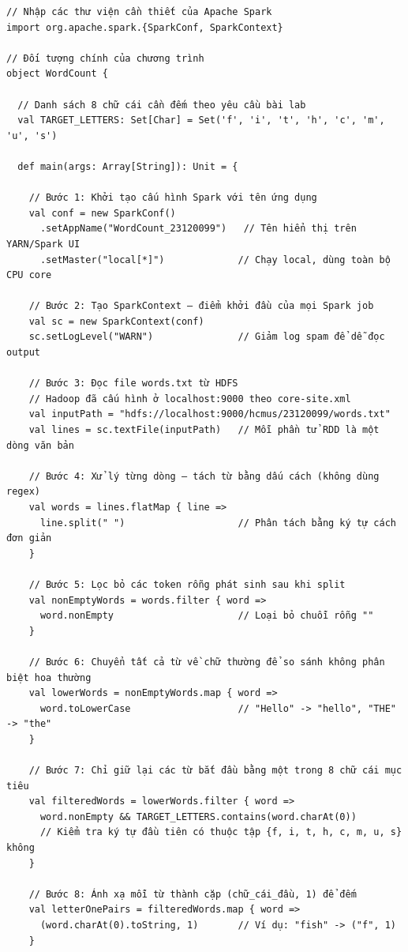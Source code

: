 \documentclass[12pt,a4paper]{article}
\begin{document}
\begin{verbatim}
// Nhập các thư viện cần thiết của Apache Spark
import org.apache.spark.{SparkConf, SparkContext}

// Đối tượng chính của chương trình
object WordCount {

  // Danh sách 8 chữ cái cần đếm theo yêu cầu bài lab
  val TARGET_LETTERS: Set[Char] = Set('f', 'i', 't', 'h', 'c', 'm', 'u', 's')

  def main(args: Array[String]): Unit = {

    // Bước 1: Khởi tạo cấu hình Spark với tên ứng dụng
    val conf = new SparkConf()
      .setAppName("WordCount_23120099")   // Tên hiển thị trên YARN/Spark UI
      .setMaster("local[*]")             // Chạy local, dùng toàn bộ CPU core

    // Bước 2: Tạo SparkContext — điểm khởi đầu của mọi Spark job
    val sc = new SparkContext(conf)
    sc.setLogLevel("WARN")               // Giảm log spam để dễ đọc output

    // Bước 3: Đọc file words.txt từ HDFS
    // Hadoop đã cấu hình ở localhost:9000 theo core-site.xml
    val inputPath = "hdfs://localhost:9000/hcmus/23120099/words.txt"
    val lines = sc.textFile(inputPath)   // Mỗi phần tử RDD là một dòng văn bản

    // Bước 4: Xử lý từng dòng — tách từ bằng dấu cách (không dùng regex)
    val words = lines.flatMap { line =>
      line.split(" ")                    // Phân tách bằng ký tự cách đơn giản
    }

    // Bước 5: Lọc bỏ các token rỗng phát sinh sau khi split
    val nonEmptyWords = words.filter { word =>
      word.nonEmpty                      // Loại bỏ chuỗi rỗng ""
    }

    // Bước 6: Chuyển tất cả từ về chữ thường để so sánh không phân biệt hoa thường
    val lowerWords = nonEmptyWords.map { word =>
      word.toLowerCase                   // "Hello" -> "hello", "THE" -> "the"
    }

    // Bước 7: Chỉ giữ lại các từ bắt đầu bằng một trong 8 chữ cái mục tiêu
    val filteredWords = lowerWords.filter { word =>
      word.nonEmpty && TARGET_LETTERS.contains(word.charAt(0))
      // Kiểm tra ký tự đầu tiên có thuộc tập {f, i, t, h, c, m, u, s} không
    }

    // Bước 8: Ánh xạ mỗi từ thành cặp (chữ_cái_đầu, 1) để đếm
    val letterOnePairs = filteredWords.map { word =>
      (word.charAt(0).toString, 1)       // Ví dụ: "fish" -> ("f", 1)
    }


\end{verbatim}
\end{document}
